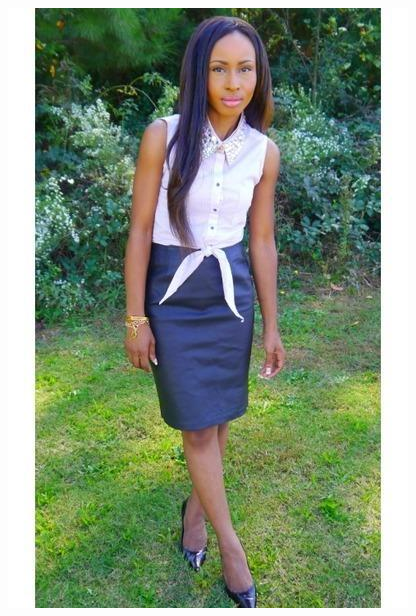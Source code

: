 \documentclass[12pt]{report}
\begin{document}
\begin{figure}
\begin{minipage}[b]{0.3\textwidth}
    \includegraphics[width=\textwidth]{images/resultados/1082993original.jpg}
  \end{minipage}
  \hfill
  \begin{minipage}[b]{0.3\textwidth}

\end{minipage}
\end{figure}
\end{document}
